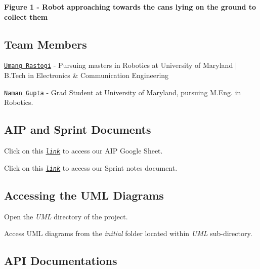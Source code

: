  {\bfseries Figure 1 -\/ Robot approaching towards the cans lying on the ground to collect them} 

\subsection*{Team Members}


\begin{DoxyItemize}
\item \href{https://github.com/urastogi885}{\tt Umang Rastogi} -\/ Pursuing masters in Robotics at University of Maryland $\vert$ B.\+Tech in Electronics \& Communication Engineering
\item \href{https://github.com/namangupta98}{\tt Naman Gupta} -\/ Grad Student at University of Maryland, pursuing M.\+Eng. in Robotics.
\end{DoxyItemize}

\subsection*{A\+IP and Sprint Documents}


\begin{DoxyItemize}
\item Click on this \href{https://docs.google.com/spreadsheets/d/1k6e7rM7TTvE5w2fQ_wuSDY_giNWaVuCHeImB6D53lT4/edit?usp=sharing}{\tt {\itshape link}} to access our A\+IP Google Sheet.
\item Click on this \href{https://docs.google.com/document/d/1iQZUstgoCCvtSvlcv1_xpxGW6ntUbkOpcgMuvrSP_ms/edit?usp=sharing}{\tt {\itshape link}} to access our Sprint notes document.
\end{DoxyItemize}

\subsection*{Accessing the U\+ML Diagrams}


\begin{DoxyItemize}
\item Open the {\itshape U\+ML} directory of the project.
\item Access U\+ML diagrams from the {\itshape initial} folder located within {\itshape U\+ML} sub-\/directory.
\end{DoxyItemize}

\subsection*{A\+PI Documentations}


